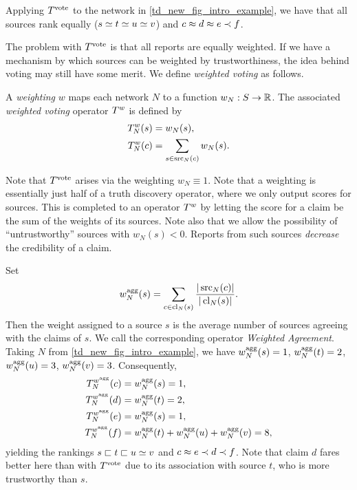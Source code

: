 Applying $T^{\operatorname{vote}}{}$ to the network in \cref{td_new_fig_intro_example}, we have
that all sources rank equally ($s \simeq t \simeq u \simeq v$) and $c \approx d \approx e
\prec f$.

The problem with $T^{\operatorname{vote}}{}$ is that all reports are equally weighted. If we
have a mechanism by which sources can be weighted by trustworthiness, the idea
behind voting may still have some merit. We define \emph{weighted voting} as
follows.

\begin{definition}
    A \emph{weighting} $w$ maps each network $N$ to a function $w_N: S \to \mathbb{R}$.
    The associated \emph{weighted voting} operator $T^{w}$ is defined by
    \begin{align*}
        T^{w}_N(s) &= w_N(s), \\
        T^{w}_N(c) &= \sum_{s \in \operatorname{src}_N(c)}{w_N(s)}.
    \end{align*}
\end{definition}

Note that $T^{\operatorname{vote}}$ arises via the weighting $w_N \equiv 1$. Note that a
weighting is essentially just half of a truth discovery operator, where we only
output scores for sources. This is completed to an operator $T^{w}$ by
letting the score for a claim be the sum of the weights of its sources. Note
also that we allow the possibility of ``untrustworthy'' sources with $w_N(s) <
0$.  Reports from such sources \emph{decrease} the credibility of a claim.

\begin{example}
    \label{td_new_ex_weighted_voting}
    Set
    \[
        w^{\operatorname{agg}}_N(s) = {
            \sum_{c \in \operatorname{cl}_N(s)}{
                \frac{|\operatorname{src}_N(c)|}{|\operatorname{cl}_N(s)|}
            }
        }.
    \]
    Then the weight assigned to a source $s$ is the average number of sources
    agreeing with the claims of $s$. We call the corresponding operator
    \emph{Weighted Agreement}. Taking $N$ from
    \cref{td_new_fig_intro_example}, we have $w^{\operatorname{agg}}_N(s) = 1$, $w^{\operatorname{agg}}_N(t) = 2$,
    $w^{\operatorname{agg}}_N(u) = 3$, $w^{\operatorname{agg}}_N(v) = 3$. Consequently,
    \begin{align*}
        T^{w^{\operatorname{agg}}}_N(c) &= w^{\operatorname{agg}}_N(s) = 1,\\
        T^{w^{\operatorname{agg}}}_N(d) &= w^{\operatorname{agg}}_N(t) = 2,\\
        T^{w^{\operatorname{agg}}}_N(e) &= w^{\operatorname{agg}}_N(s) = 1,\\
        T^{w^{\operatorname{agg}}}_N(f) &= w^{\operatorname{agg}}_N(t) + w^{\operatorname{agg}}_N(u) + w^{\operatorname{agg}}_N(v) = 8,
    \end{align*}
    yielding the rankings $s \sqsubset t \sqsubset u \simeq v$ and $c \approx e \prec d \prec
    f$. Note that claim $d$ fares better here than with $T^{\operatorname{vote}}$ due to its
    association with source $t$, who is more trustworthy than $s$.
\end{example}

